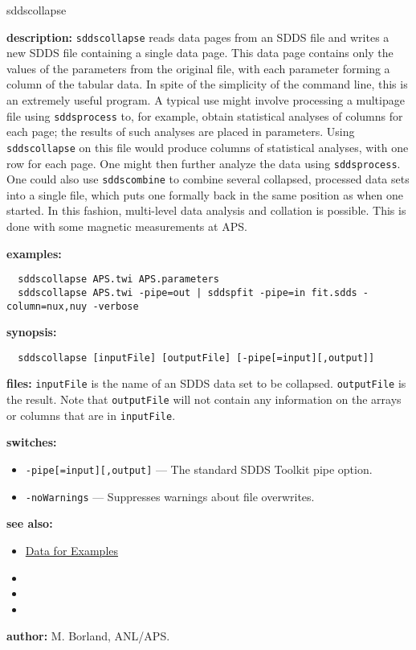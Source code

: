 \begin{sddsprog}{sddscollapse}
  \item \textbf{description:} \verb|sddscollapse| reads data pages from an SDDS file and writes a new SDDS file containing a single data page. This data page contains only the values of the parameters from the original file, with each parameter forming a column of the tabular data. In spite of the simplicity of the command line, this is an extremely useful program. A typical use might involve processing a multipage file using \verb|sddsprocess| to, for example, obtain statistical analyses of columns for each page; the results of such analyses are placed in parameters. Using \verb|sddscollapse| on this file would produce columns of statistical analyses, with one row for each page. One might then further analyze the data using \verb|sddsprocess|. One could also use \verb|sddscombine| to combine several collapsed, processed data sets into a single file, which puts one formally back in the same position as when one started. In this fashion, multi-level data analysis and collation is possible. This is done with some magnetic measurements at APS.

  \item \textbf{examples:}
  \begin{verbatim}
  sddscollapse APS.twi APS.parameters
  sddscollapse APS.twi -pipe=out | sddspfit -pipe=in fit.sdds -column=nux,nuy -verbose
  \end{verbatim}

  \item \textbf{synopsis:}
  \begin{verbatim}
  sddscollapse [inputFile] [outputFile] [-pipe[=input][,output]]
  \end{verbatim}

  \item \textbf{files:} \verb|inputFile| is the name of an SDDS data set to be collapsed.  \verb|outputFile| is the result.  Note that \verb|outputFile| will not contain any information on the arrays or columns that are in \verb|inputFile|.

  \item \textbf{switches:}
  \begin{itemize}
    \item \verb|-pipe[=input][,output]| --- The standard SDDS Toolkit pipe option.
    \item \verb|-noWarnings| --- Suppresses warnings about file overwrites.
  \end{itemize}

  \item \textbf{see also:}
  \begin{itemize}
    \item \hyperref[exampleData]{Data for Examples}
    \item {}
    \item {}
    \item {}
  \end{itemize}

  \item \textbf{author:} M. Borland, ANL/APS.
\end{sddsprog}

